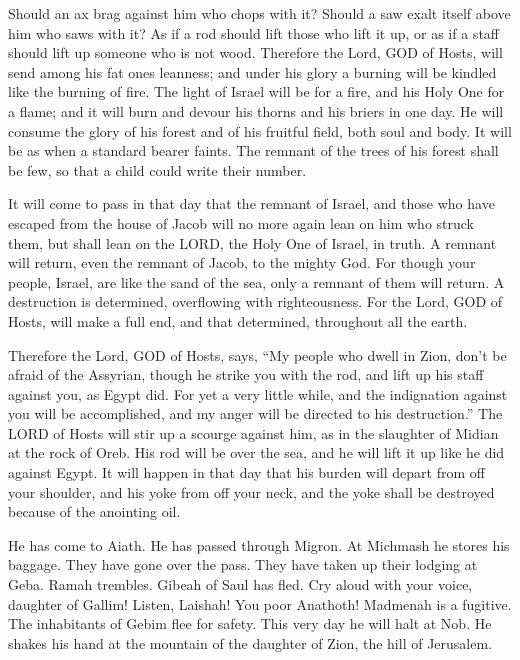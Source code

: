 \myverse{}Should an ax brag against him who chops with it? Should a saw
exalt itself above him who saws with it? As if a rod should lift those who lift it up, or as if a staff
should lift up someone who is not wood.
\myverse{}Therefore the Lord, GOD of Hosts, will send among his fat ones leanness;
and under his glory a burning will be kindled like the burning of fire.
\myverse{}The light of Israel will be for a fire, and his Holy One for a flame; and
it will burn and devour his thorns and his briers in one day.
\myverse{}He will consume the glory of his forest and of his fruitful field, both soul
and body. It will be as when a standard bearer faints.
\myverse{}The remnant of the trees of his forest shall be few, so that a child could
write their number.

\myverse{}It will come to pass in that day that the remnant of Israel,
and those who have escaped from the house of Jacob will no more again lean on him who struck them, but
shall lean on the LORD, the Holy One of Israel, in truth.
\myverse{}A remnant will return, even the remnant of Jacob, to the mighty God.
\myverse{}For though your people, Israel, are like the sand of the sea, only a remnant
of them will return. A destruction is determined, overflowing with righteousness.
\myverse{}For the Lord, GOD of Hosts, will make a full end, and that determined, throughout
all the earth.

\myverse{}Therefore the Lord, GOD of Hosts, says, “My people who dwell
in Zion, don’t be afraid of the Assyrian, though he strike you with the rod, and lift up his staff against
you, as Egypt did.
\myverse{}For yet a very little while, and the indignation against you will be accomplished,
and my anger will be directed to his destruction.”
\myverse{}The LORD of Hosts will stir up a scourge against him, as in the slaughter
of Midian at the rock of Oreb. His rod will be over the sea, and he will lift it up like he did against
Egypt.
\myverse{}It will happen in that day that his burden will depart from off your shoulder,
and his yoke from off your neck, and the yoke shall be destroyed because of the anointing oil.

\myverse{}He has come to Aiath. He has passed through Migron. At Michmash
he stores his baggage.
\myverse{}They have gone over the pass. They have taken up their lodging at Geba. Ramah
trembles. Gibeah of Saul has fled.
\myverse{}Cry aloud with your voice, daughter of Gallim! Listen, Laishah! You poor
Anathoth!
\myverse{}Madmenah is a fugitive. The inhabitants of Gebim flee for safety.
\myverse{}This very day he will halt at Nob. He shakes his hand at the mountain of
the daughter of Zion, the hill of Jerusalem.

